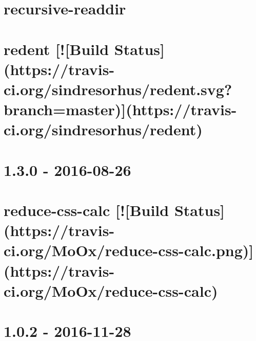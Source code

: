 \documentclass[twoside]{book}
\newcommand{\+}{\discretionary{\mbox{\scriptsize$\hookleftarrow$}}{}{}}
\begin{document}
\chapter{recursive-\/readdir}
\label{md__c_1_workspace_demo_src_main_script_node_modules_recursive-readdir__r_e_a_d_m_e}

\chapter{redent \mbox{[}!\mbox{[}Build Status\mbox{]}(https\+://travis-\/ci.org/sindresorhus/redent.svg?branch=master)\mbox{]}(https\+://travis-\/ci.org/sindresorhus/redent)}
\label{md__c_1_workspace_demo_src_main_script_node_modules_redent_readme}

\chapter{1.3.0 -\/ 2016-\/08-\/26}
\label{md__c_1_workspace_demo_src_main_script_node_modules_reduce-css-calc__c_h_a_n_g_e_l_o_g}

\chapter{reduce-\/css-\/calc \mbox{[}!\mbox{[}Build Status\mbox{]}(https\+://travis-\/ci.org/\+Mo\+Ox/reduce-\/css-\/calc.png)\mbox{]}(https\+://travis-\/ci.org/\+Mo\+Ox/reduce-\/css-\/calc)}
\label{md__c_1_workspace_demo_src_main_script_node_modules_reduce-css-calc__r_e_a_d_m_e}

\chapter{1.0.2 -\/ 2016-\/11-\/28}
\label{md__c_1_workspace_demo_src_main_script_node_modules_reduce-function-call__c_h_a_n_g_e_l_o_g}

\end{document}
